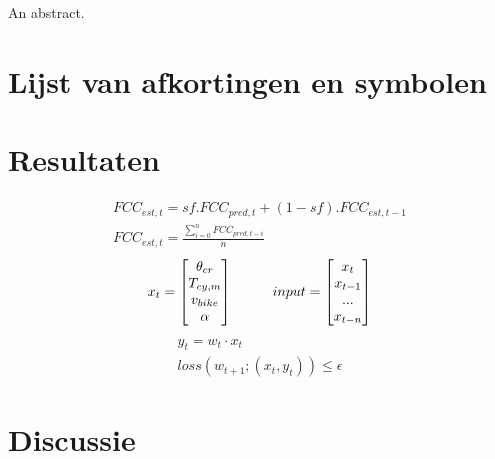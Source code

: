 \documentclass[12pt,a4paper,oneside]{book}
\newcommand\tab[1][1cm]{\hspace*{#1}}
\begin{document}
An abstract.
\tableofcontents
\listoffigures
{}

\chapter{Lijst van afkortingen en symbolen}
\printglossary[type=\acronymtype,title=Afkortingen]
\printglossary[title=Symbolen]

\mainmatter
{}



\chapter{Resultaten}
\begin{gather*}
FCC_{est,t} = sf . FCC_{pred,t} + (1-sf) . FCC_{est,t-1} \\
FCC_{est,t} = \frac{\sum_{i=0}^{n} FCC_{pred,t-i} }{n}
\end{gather*}
\begin{gather*}
x_t = \begin{bmatrix} 
       \theta _{cr} \\ T_{cy,m} \\ v_{bike} \\ \alpha
     \end{bmatrix} \tab
input = \begin{bmatrix} 
       x_t \\ x_{t-1} \\ ... \\ x_{t-n}
     \end{bmatrix} 
\end{gather*}
\begin{gather*}
y_t=w_t \cdot x_t\\
loss(w_{t+1};(x_t,y_t)) \leq \epsilon
\end{gather*}



\chapter{Discussie}
\end{document}
